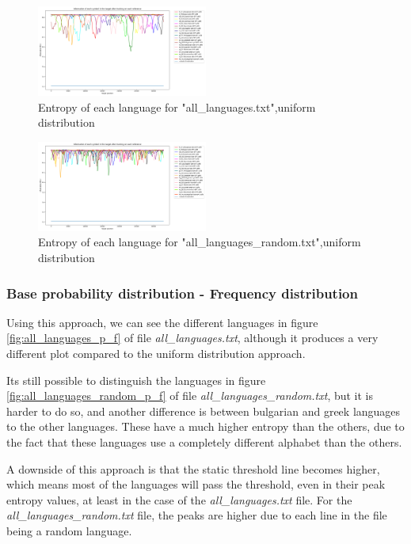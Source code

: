 \documentclass{article}
\begin{document}
\begin{figure}
    \centering
    \includegraphics[width=0.5\textwidth]{../results/all_languages/-p_u.png}
    \caption{Entropy of each language for "all_languages.txt",uniform distribution}
    \label{fig:all_languages_p_u}
\end{figure}

\begin{figure}
    \centering
    \includegraphics[width=0.5\textwidth]{../results/all_languages_random/-p_u.png}
    \caption{Entropy of each language for "all_languages_random.txt",uniform distribution}
    \label{fig:all_languages_random_p_u}
\end{figure}

\subsubsection{Base probability distribution - Frequency distribution}
\label{subsubsec:results_locate_lang_frequency_distribution}

Using this approach, we can see the different languages in figure \ref{fig:all_languages_p_f} of file \textit{all_languages.txt}, although it produces a very different plot
compared to the uniform distribution approach.

Its still possible to distinguish the languages in figure \ref{fig:all_languages_random_p_f} of file \textit{all_languages_random.txt}, but it is harder to do so,
and another difference is between bulgarian and greek languages to the other languages. These have a much higher entropy than the others, due to the fact that these
languages use a completely different alphabet than the others.

A downside of this approach is that the static threshold line becomes higher, which means most of the languages will pass the threshold, even in their peak entropy values,
at least in the case of the \textit{all_languages.txt} file. For the \textit{all_languages_random.txt} file, the peaks are higher due to each line in the file being a random language.
\end{document}
